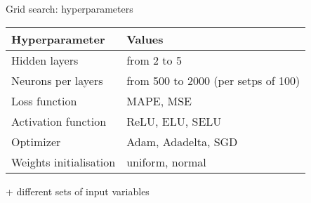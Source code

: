 \begin{frame}{Grid search: hyperparameters}

\begin{center}
\begin{tabular}{ll}
\toprule
Hyperparameter & Values\\
\midrule
Hidden layers & from 2 to 5\\
Neurons per layers & from 500 to 2000 (per setps of 100)\\
Loss function & MAPE, MSE\\
Activation function & ReLU, ELU, SELU\\
Optimizer & Adam, Adadelta, SGD\\
Weights initialisation & uniform, normal\\
\bottomrule
\end{tabular}
\end{center}

+ different sets of input variables

\end{frame}
